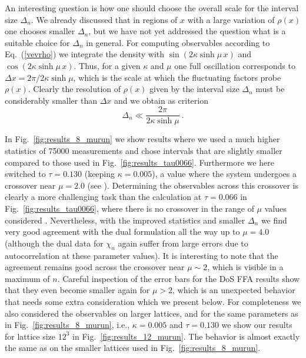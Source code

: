 \documentclass[a4paper,11pt]{article}
\begin{document}
An interesting question is how one should choose the overall scale for the interval size $\Delta_n$. We already 
discussed that in regions of $x$ with a large variation of $\rho(x)$ one chooses smaller $\Delta_n$, but we 
have not yet addressed the question what is a suitable choice for $\Delta_n$ in general. For 
computing observables according to Eq.~(\ref{vevrho}) we integrate the density with $\sin( 2\kappa \sinh\! \mu \, x)$ and
$\cos( 2\kappa \sinh\! \mu \, x)$. Thus, for a given $\kappa$ and $\mu$ one full oscillation corresponds to 
$\Delta x = 2\pi/ 2\kappa \sinh\! \mu$, which is the scale at which the fluctuating factors probe $\rho(x)$. 
Clearly the resolution of $\rho(x)$ given by the interval size $\Delta_n$ must be considerably smaller than 
$\Delta x$ and we obtain as criterion
%
\begin{equation}
\label{eq:thumb}
\Delta_n \ll \frac{2 \pi}{2 \kappa \sinh{\mu}} ~.
\end{equation}  
%

In Fig.~\ref{fig:results_8_murun} we show results where we used a much higher statistics of 
75000 measurements and chose intervals that are slightly smaller compared to those 
used in Fig.~\ref{fig:results_tau0066}. Furthermore we here switched to $\tau=0.130$ (keeping $\kappa = 0.005$),
a value where the system undergoes a crossover near $\mu = 2.0$ (see \cite{Mercado:2012ue}). 
Determining the observables across this crossover is clearly a more challenging task than the 
calculation at $\tau = 0.066$ in Fig.~\ref{fig:results_tau0066}, where there is no crossover in the range of
$\mu$ values considered  \cite{Mercado:2012ue}. Nevertheless, with the improved statistics and smaller 
$\Delta_n$ we find very good agreement with the dual formulation all the way up to $\mu = 4.0$ (although the 
dual data for $\chi_n$ again suffer from large errors due to autocorrelation at these parameter values). It is interesting to 
note that the agreement remains good across the crossover near $\mu \sim 2$, which is visible in a
maximum of $n$. Careful inspection of the error bars for the DoS FFA results show that they even become 
smaller again for $\mu > 2$, which is an unexpected behavior that needs 
some extra consideration which we present below. 
For completeness we also considered the observables on larger lattices, and for the same parameters as in 
Fig.~\ref{fig:results_8_murun}, i.e., $\kappa = 0.005$ and $\tau = 0.130$ we show our results for lattice size
$12^3$ in Fig.~\ref{fig:results_12_murun}. The behavior is almost exactly the same as on the smaller lattices 
used in Fig.~\ref{fig:results_8_murun}. 
\end{document}

